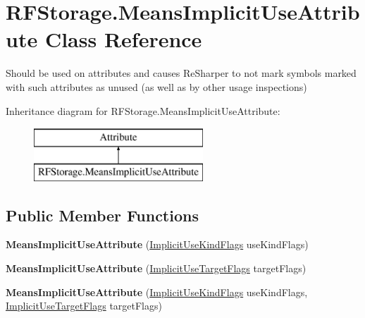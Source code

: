 \hypertarget{class_r_f_storage_1_1_means_implicit_use_attribute}{}\section{R\+F\+Storage.\+Means\+Implicit\+Use\+Attribute Class Reference}
\label{class_r_f_storage_1_1_means_implicit_use_attribute}


Should be used on attributes and causes Re\+Sharper to not mark symbols marked with such attributes as unused (as well as by other usage inspections)  


Inheritance diagram for R\+F\+Storage.\+Means\+Implicit\+Use\+Attribute\+:\begin{figure}[H]
\begin{center}
\leavevmode
\includegraphics[height=2.000000cm]{class_r_f_storage_1_1_means_implicit_use_attribute}
\end{center}
\end{figure}
\subsection*{Public Member Functions}
\begin{DoxyCompactItemize}
\item 
\mbox{\label{class_r_f_storage_1_1_means_implicit_use_attribute_a56697a8c2b8c4ea67b453bc051a20976}} 
{\bfseries Means\+Implicit\+Use\+Attribute} (\mbox{\hyperlink{namespace_r_f_storage_a858608c6c632849e1730c5fafed9fa25}{Implicit\+Use\+Kind\+Flags}} use\+Kind\+Flags)
\item 
\mbox{\label{class_r_f_storage_1_1_means_implicit_use_attribute_a1e4ce56a963b1da6864b3595c11c9743}} 
{\bfseries Means\+Implicit\+Use\+Attribute} (\mbox{\hyperlink{namespace_r_f_storage_a11267cbdad6c26a08cf6b5c281d2f67b}{Implicit\+Use\+Target\+Flags}} target\+Flags)
\item 
\mbox{\label{class_r_f_storage_1_1_means_implicit_use_attribute_a2147079ad27dcb23ef57eb85984fd5b8}} 
{\bfseries Means\+Implicit\+Use\+Attribute} (\mbox{\hyperlink{namespace_r_f_storage_a858608c6c632849e1730c5fafed9fa25}{Implicit\+Use\+Kind\+Flags}} use\+Kind\+Flags, \mbox{\hyperlink{namespace_r_f_storage_a11267cbdad6c26a08cf6b5c281d2f67b}{Implicit\+Use\+Target\+Flags}} target\+Flags)
\end{DoxyCompactItemize}
